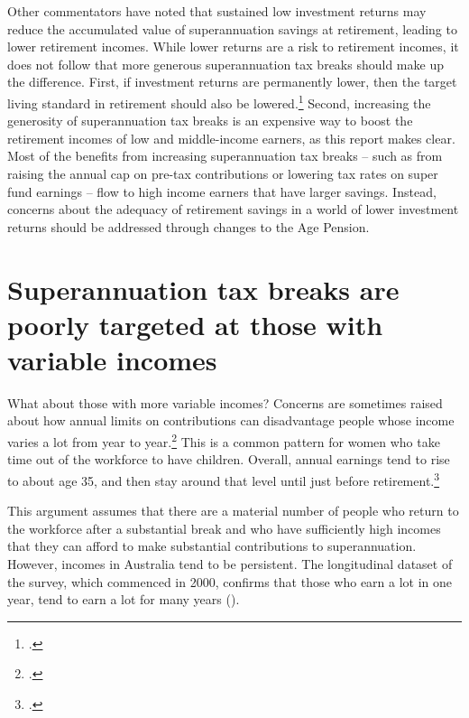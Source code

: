 Other commentators have noted that sustained low investment returns may reduce the accumulated value of superannuation savings at retirement, leading to lower retirement incomes.  While lower returns are a risk to retirement incomes, it does not follow that more generous superannuation tax breaks should make up the difference. First, if investment returns are permanently lower, then the target living standard in retirement should also be lowered.\footcites[][9]{ActuariesInstitute2015RetirementIncomes}{Blayney2015} Second, increasing the generosity of superannuation tax breaks is an expensive way to boost the retirement incomes of low and middle-income earners, as this report makes clear. Most of the benefits from increasing superannuation tax breaks – such as from raising the annual cap on pre-tax contributions or lowering tax rates on super fund earnings – flow to high income earners that have larger savings. Instead, concerns about the adequacy of retirement savings in a world of lower investment returns should be addressed through changes to the Age Pension.

\section{Superannuation tax breaks are poorly targeted at those with variable incomes\label{sec:SUPER-3-4}}
What about those with more variable incomes? Concerns are sometimes raised about how annual limits on contributions can disadvantage people whose income varies a lot from year to year.\footcite[][5]{ASFA2015b} This is a common pattern for women who take time out of the workforce to have children. Overall, annual earnings tend to rise to about age 35, and then stay around that level until just before retirement.\footcite[][18,19,49--50]{DaleyWoodWeidmannEtAl2014}  

This argument assumes that there are a material number of people who return to the workforce after a substantial break and who have sufficiently high incomes that they can afford to make substantial contributions to superannuation. However, incomes in Australia tend to be persistent. The longitudinal dataset of the \textcite{HILDA2015} survey, which commenced in 2000, confirms that those who earn a lot in one year, tend to earn a lot for many years ().


